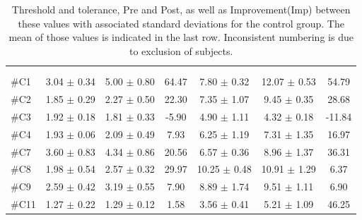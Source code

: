 \begin{longtable} {l|c|c|c|c|c|c}
\caption{Threshold and tolerance, Pre and Post, as well as Improvement(Imp) between these values with associated standard deviations for the control group. The mean of those values is indicated in the last row. Inconsistent numbering is due to exclusion of subjects.}
	\label{tab:Control} \\
\cellcolor[HTML]{C0C0C0} {} & 
\multicolumn{3}{c|}{ \cellcolor[HTML]{C0C0C0}{\textbf{Threshold}}} & \multicolumn{3}{c}{ \cellcolor[HTML]{C0C0C0}{\textbf{Tolerance}}}  	\\  \rule{0pt}{3ex} 
  \cellcolor[HTML]{C0C0C0}{} &
 \multicolumn{1}{c|}{ \cellcolor[HTML]{C0C0C0}{Pre [kgF]}} & \multicolumn{1}{c|}{ \cellcolor[HTML]{C0C0C0}{Post [kgF]}} & \multicolumn{1}{c|}{ \cellcolor[HTML]{C0C0C0}{Imp [\%]}} 
 & \multicolumn{1}{|c|}{ \cellcolor[HTML]{C0C0C0}{Pre [kgF]}} 
 & \multicolumn{1}{c|}{ \cellcolor[HTML]{C0C0C0}{Post [kgF]}} & \multicolumn{1}{c|}{ \cellcolor[HTML]{C0C0C0}{Imp[\%]}} \\ \hline  
\#C1 & 3.04 $\pm$ 0.34	& 5.00 $\pm$ 0.80 & 64.47	& 7.80 $\pm$	 0.32 & 12.07 $\pm$ 0.53 & 54.79 \\ \hline
\#C2 & 1.85 $\pm$ 0.29 	& 2.27 $\pm$ 0.50 & 22.30	& 7.35 $\pm$ 1.07	& 9.45 $\pm$ 0.35 & 28.68	\\ \hline
\#C3 & 1.92 $\pm$ 0.18 & 1.81 $\pm$ 0.33 &-5.90 & 4.90 $\pm$ 1.11 	& 	4.32 $\pm$ 0.18 & -11.84	\\ \hline
\#C4 & 1.93 $\pm$ 0.06 & 2.09 $\pm$ 0.49 & 7.93	& 6.25 $\pm$ 1.19	&7.31 $\pm$ 	1.35  & 16.97 \\ \hline
\#C7 & 3.60 $\pm$ 0.83  & 4.34 $\pm$	0.86 & 20.56	& 6.57 $\pm$ 0.36 & 8.96 $\pm$ 1.37 & 36.31 \\ \hline
\#C8 & 1.98 $\pm$ 0.54 & 2.57 $\pm$ 0.32 & 29.97	& 10.25 $\pm$ 0.48	& 10.91 $\pm$  1.29 & 6.37 \\ \hline
\#C9 & 2.59 $\pm$ 0.42 & 3.19 $\pm$ 0.55 & 7.90 & 8.89 $\pm$ 1.74	& 9.51 $\pm$  1.11 & 6.90 \\ \hline
\#C11 & 1.27 $\pm$ 0.22 & 1.29 	$\pm$ 0.12 & 1.58 	& 3.56 $\pm$ 0.41 & 5.21 $\pm$ 1.09 & 46.25 \\ \hline

\end{longtable}
